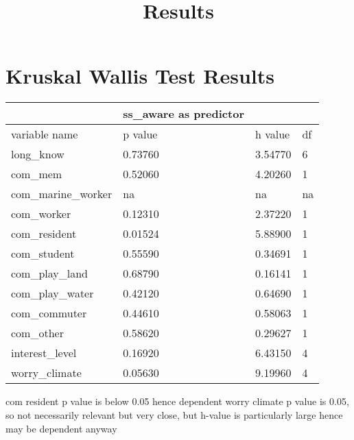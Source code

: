 \documentclass{article}
\title{Results}
\begin{document}

\section{Kruskal Wallis Test Results}
\begin{table}[!ht]
    \centering
    \begin{tabular}{|l|l|l|l|}
    \hline
         ~ & ss\_aware as predictor & ~ & ~ \\ \hline
        variable name & p value & h value & df \\ \hline
           long\_know & 0.73760 & 3.54770 & 6 \\ \hline
        com\_mem & 0.52060 & 4.20260 & 1 \\ \hline
        com\_marine\_worker & na & na & na \\ \hline
        com\_worker & 0.12310 & 2.37220 & 1 \\ \hline
        com\_resident & 0.01524 & 5.88900 & 1 \\ \hline
        com\_student & 0.55590 & 0.34691 & 1 \\ \hline
        com\_play\_land & 0.68790 & 0.16141 & 1 \\ \hline
        com\_play\_water & 0.42120 & 0.64690 & 1 \\ \hline
        com\_commuter & 0.44610 & 0.58063 & 1 \\ \hline
        com\_other & 0.58620 & 0.29627 & 1 \\ \hline
        interest\_level & 0.16920 & 6.43150 & 4 \\ \hline
        worry\_climate & 0.05630 & 9.19960 & 4 \\ \hline
    \end{tabular}
\end{table}
com resident p value is below 0.05 hence dependent
worry climate p value is 0.05, so not necessarily relevant but very close, but h-value is particularly large hence may be dependent anyway
\end{document}
